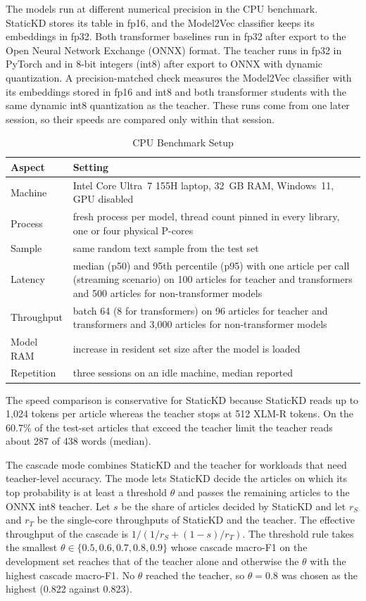 \documentclass{ieeeaccess}
\begin{document}
The models run at different numerical precision in the CPU benchmark. StaticKD stores its table in fp16, and the Model2Vec classifier keeps its embeddings in fp32. Both transformer baselines run in fp32 after export to the Open Neural Network Exchange (ONNX) format. The teacher runs in fp32 in PyTorch and in 8-bit integers (int8) after export to ONNX with dynamic quantization.
A precision-matched check measures the Model2Vec classifier with its embeddings stored in fp16 and int8 and both transformer students with the same dynamic int8 quantization as the teacher. These runs come from one later session, so their speeds are compared only within that session.

\begin{table}[!t]
\caption{CPU Benchmark Setup}
\label{tab:effsetup}
\centering
\footnotesize
\setlength{\tabcolsep}{3pt}
\begin{tabular}{@{}p{}p{}@{}}
\toprule
Aspect & Setting \\
\midrule
Machine & Intel Core Ultra~7 155H laptop, 32~GB RAM, Windows~11, GPU disabled \\
Process & fresh process per model, thread count pinned in every library, one or four physical P-cores \\
Sample & same random text sample from the test set \\
Latency & median (p50) and 95th percentile (p95) with one article per call (streaming scenario) on 100 articles for teacher and transformers and 500 articles for non-transformer models \\
Throughput & batch 64 (8 for transformers) on 96 articles for teacher and transformers and 3,000 articles for non-transformer models \\
Model RAM & increase in resident set size after the model is loaded \\
Repetition & three sessions on an idle machine, median reported \\
\bottomrule
\end{tabular}
\end{table}

The speed comparison is conservative for StaticKD because StaticKD reads up to 1,024 tokens per article whereas the teacher stops at 512 XLM-R tokens. On the 60.7\% of the test-set articles that exceed the teacher limit the teacher reads about 287 of 438 words (median).

The cascade mode combines StaticKD and the teacher for workloads that need teacher-level accuracy. The mode lets StaticKD decide the articles on which its top probability is at least a threshold $\theta$ and passes the remaining articles to the ONNX int8 teacher. Let $s$ be the share of articles decided by StaticKD and let $r_S$ and $r_T$ be the single-core throughputs of StaticKD and the teacher. The effective throughput of the cascade is $1/(1/r_S+(1-s)/r_T)$. The threshold rule takes the smallest $\theta\in\{0.5,0.6,0.7,0.8,0.9\}$ whose cascade macro-F1 on the development set reaches that of the teacher alone and otherwise the $\theta$ with the highest cascade macro-F1. No $\theta$ reached the teacher, so $\theta=0.8$ was chosen as the highest (0.822 against 0.823).
\end{document}
